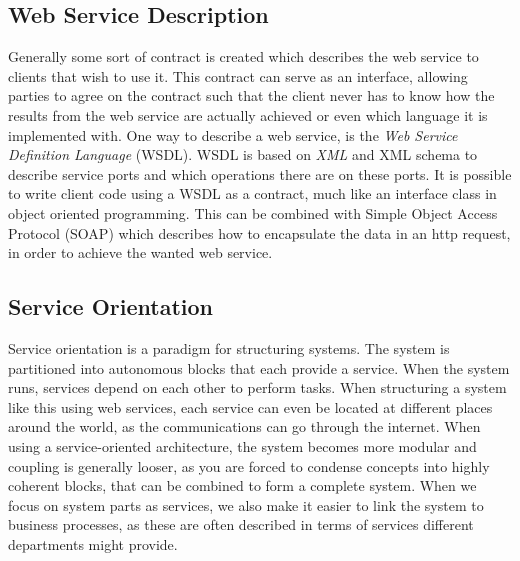 \subsection{Web Service Description}
Generally some sort of contract is created which describes the web service to clients that wish to use it. This contract can serve as an interface, allowing parties to agree on the contract such that the client never has to know how the results from the web service are actually achieved or even which language it is implemented with. One way to describe a web service, is the \emph{Web Service Definition Language} (WSDL). WSDL is based on \emph{XML} and XML schema to describe service ports and which operations there are on these ports. It is possible to write client code using a WSDL as a contract, much like an interface class in object oriented programming. This can be combined with Simple Object Access Protocol (SOAP) which describes how to encapsulate the data in an http request, in order to achieve the wanted web service.


\subsection{Service Orientation}
Service orientation is a paradigm for structuring systems. The system is partitioned into autonomous blocks that each provide a service. When the system runs, services depend on each other to perform tasks. When structuring a system like this using web services, each service can even be located at different places around the world, as the communications can go through the internet. When using a service-oriented architecture, the system becomes more modular and coupling is generally looser, as you are forced to condense concepts into highly coherent blocks, that can be combined to form a complete system. When we focus on system parts as services, we also make it easier to link the system to business processes, as these are often described in terms of services different departments might provide.

